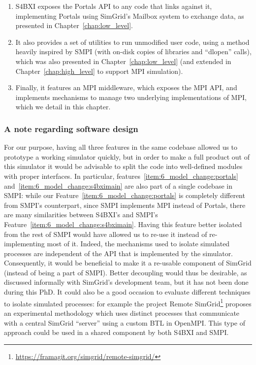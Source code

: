 \begin{enumerate}
    \item\label{item:6_model_change:portals} S4BXI exposes the Portals API to
    any code that links against it, implementing Portals using SimGrid's Mailbox
    system to exchange data, as presented in Chapter~\ref{chap:low_level}.
    \item\label{item:6_model_change:s4bximain} It also provides a set of
    utilities to run unmodified user code, using a method heavily inspired by
    SMPI (with on-disk copies of libraries and ``dlopen'' calls), which was also
    presented in Chapter~\ref{chap:low_level} (and extended in
    Chapter~\ref{chap:high_level} to support MPI simulation).
    \item\label{item:6_model_change:middleware} Finally, it features an MPI
    middleware, which exposes the MPI API, and implements mechanisms to manage
    two underlying implementations of MPI, which we detail in this chapter.
\end{enumerate}

\subsubsection{A note regarding software design}

For our purpose, having all three features in the same codebase allowed us to
prototype a working simulator quickly, but in order to make a full product out
of this simulator it would be advisable to split the code into well-defined
modules with proper interfaces. In particular,
features~\ref{item:6_model_change:portals}
and~\ref{item:6_model_change:s4bximain} are also part of a single codebase in
SMPI: while our Feature~\ref{item:6_model_change:portals} is completely
different from SMPI's counterpart, since SMPI implements MPI instead of Portals,
there are many similarities between S4BXI's and SMPI's
Feature~\ref{item:6_model_change:s4bximain}. Having this feature better isolated
from the rest of SMPI would have allowed us to re-use it instead of
re-implementing most of it. Indeed, the mechanisms used to isolate simulated
processes are independent of the API that is implemented by the simulator.
Consequently, it would be beneficial to make it a re-usable component of SimGrid
(instead of being a part of SMPI). Better decoupling would thus be desirable, as
discussed informally with SimGrid's development team, but it has not been done
during this PhD. It could also be a good occasion to evaluate different
techniques to isolate simulated processes: for example the project Remote
SimGrid\footnote{\url{https://framagit.org/simgrid/remote-simgrid/}} proposes an
experimental methodology which uses distinct processes that communicate with a
central SimGrid ``server'' using a custom BTL in OpenMPI. This type of approach
could be used in a shared component by both S4BXI and SMPI.

